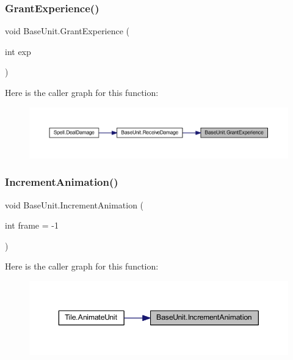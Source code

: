 \mbox{\label{class_base_unit_a38fdc01e0ff77bcc22f10d4ce06d0e25}} 
\subsubsection{\texorpdfstring{GrantExperience()}{GrantExperience()}}
{\footnotesize\ttfamily void Base\+Unit.\+Grant\+Experience (\begin{DoxyParamCaption}\item[{int}]{exp }\end{DoxyParamCaption})}

Here is the caller graph for this function\+:\nopagebreak
\begin{figure}[H]
\begin{center}
\leavevmode
\includegraphics[width=350pt]{class_base_unit_a38fdc01e0ff77bcc22f10d4ce06d0e25_icgraph}
\end{center}
\end{figure}
\mbox{\label{class_base_unit_a007c44552627a4ee773771383198077f}} 
\subsubsection{\texorpdfstring{IncrementAnimation()}{IncrementAnimation()}}
{\footnotesize\ttfamily void Base\+Unit.\+Increment\+Animation (\begin{DoxyParamCaption}\item[{int}]{frame = {\ttfamily -\/1} }\end{DoxyParamCaption})}

Here is the caller graph for this function\+:\nopagebreak
\begin{figure}[H]
\begin{center}
\leavevmode
\includegraphics[width=350pt]{class_base_unit_a007c44552627a4ee773771383198077f_icgraph}
\end{center}
\end{figure}
\mbox{\label{class_base_unit_ae32912e26fcd7ea4b251045742064af4}} 

